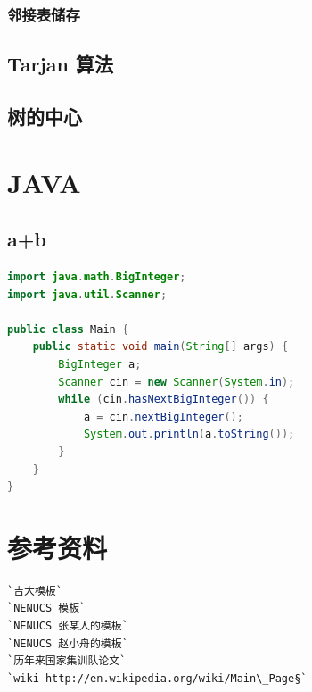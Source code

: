 \documentclass[a4paper]{article}
\begin{document}
\begin{CJK*}{UTF8}{gbsn}
\begin{multicols}{3}
\begin{flushleft}
\subsubsection{邻接表储存}


\subsection{Tarjan 算法}


\subsection{树的中心}


\section{JAVA}
\subsection{a+b}
\begin{lstlisting}[language={Java}]
import java.math.BigInteger;
import java.util.Scanner;

public class Main {
    public static void main(String[] args) {
        BigInteger a;
        Scanner cin = new Scanner(System.in);
        while (cin.hasNextBigInteger()) {
            a = cin.nextBigInteger();
            System.out.println(a.toString());
        }
    }
}
\end{lstlisting}

\section{参考资料}
\begin{lstlisting}
`吉大模板`
`NENUCS 模板`
`NENUCS 张某人的模板`
`NENUCS 赵小舟的模板`
`历年来国家集训队论文`
`wiki http://en.wikipedia.org/wiki/Main\_Page§`
\end{lstlisting}


\end{flushleft}
\clearpage
\end{multicols}
\end{CJK*}
\end{document}
